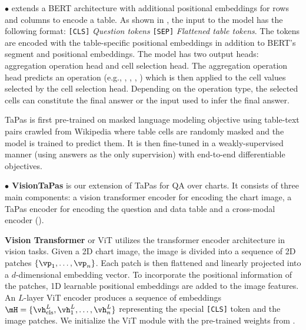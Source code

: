 \vspace{0.2em}
\noindent \textbf{$\bullet$ {}} \cite{tapas} extends a BERT \cite{BERT} architecture with additional positional embeddings for rows and columns to encode a table. 
As shown in , the input to the model has the following format: \texttt{[CLS]} \textit{Question tokens} \texttt{[SEP]} \textit{Flattened table tokens}. The tokens are encoded with the table-specific positional embeddings in addition to BERT's segment and positional 
embeddings. The model has two output heads: aggregation operation head and cell selection head. The aggregation operation head predicts an operation (e.g., {}, {}, {}, {}) which is then applied to the cell values selected  by the cell selection head. Depending on the operation type, the selected cells can constitute the final
answer or the input used to infer the final answer. 

TaPas is first pre-trained on masked language modeling objective using table-text pairs crawled from Wikipedia where table cells are randomly masked and the model is trained to predict them. It is then fine-tuned in a weakly-supervised  manner (using answers as the only supervision) with end-to-end differentiable objectives. 




\vspace{0.2em}
\noindent \textbf{ $\bullet$ VisionTaPas} is our extension of TaPas for QA over charts. It consists of three main components: a vision transformer encoder for encoding the chart image, a TaPas encoder for encoding the question and data table and a cross-modal encoder ().  





\textbf{Vision Transformer} or ViT \cite{vit} utilizes the  transformer encoder architecture \cite{VaswaniSPUJGKP17} in vision tasks. Given a 2D chart image, the image is divided into a sequence of 2D patches $\{\vp_1, \ldots, \vp_n\}$. Each patch is then flattened and linearly projected into a $d$-dimensional embedding vector. To incorporate the positional information of the patches, 1D learnable positional embeddings are added to the image features. An $L$-layer ViT encoder produces a sequence of embeddings $\mH =  \{\vh_{\text{cls}}^L, \vh_1^L, \ldots, \vh_n^L\}$ representing the special \texttt{[CLS]} token and the image patches. We initialize the ViT module with the pre-trained weights from \cite{vit}.   


